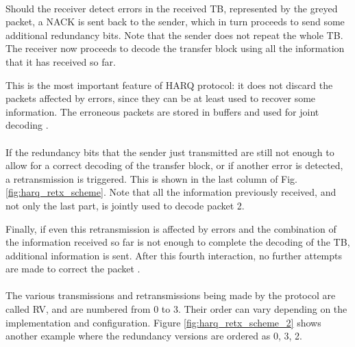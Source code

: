 \paragraph{} Should the receiver detect errors in the received \ac{TB}, represented by the greyed packet, a \ac{NACK} is sent back to the sender, which in turn proceeds to send some additional redundancy bits. Note that the sender does not repeat the whole \ac{TB}. The receiver now proceeds to decode the transfer block using all the information that it has received so far.

This is the most important feature of \ac{HARQ} protocol: it does not discard the packets affected by errors, since they can be at least used to recover some information. The erroneous packets are stored in buffers and used for joint decoding \cite{5g-nr-harq-devopedia}. 

\paragraph{} If the redundancy bits that the sender just transmitted are still not enough to allow for a correct decoding of the transfer block, or if another error is detected, a retransmission is triggered. This is shown in the last column of Fig. \ref{fig:harq_retx_scheme}. Note that all the information previously received, and not only the last part, is jointly used to decode packet 2.

Finally, if even this retransmission is affected by errors and the combination of the information received so far is not enough to complete the decoding of the \ac{TB}, additional information is sent. After this fourth interaction, no further attempts are made to correct the packet \cite{5g-nr-harq-sharetechnote}.

\paragraph{} The various transmissions and retransmissions being made by the protocol are called \ac{RV}, and are numbered from 0 to 3. Their order can vary depending on the implementation and configuration. Figure \ref{fig:harq_retx_scheme_2} shows another example where the redundancy versions are ordered as 0, 3, 2.

